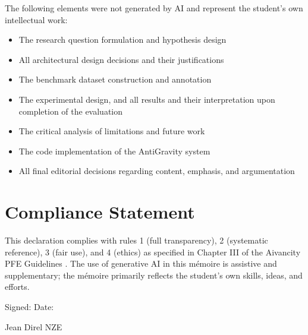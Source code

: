 The following elements were not generated by AI and represent the student's own intellectual work:

\begin{itemize}
  \item The research question formulation and hypothesis design
  \item All architectural design decisions and their justifications
  \item The benchmark dataset construction and annotation
  \item The experimental design, and all results and their interpretation upon completion of the evaluation
  \item The critical analysis of limitations and future work
  \item The code implementation of the AntiGravity system
  \item All final editorial decisions regarding content, emphasis, and argumentation
\end{itemize}

\section*{Compliance Statement}

This declaration complies with rules 1 (full transparency), 2 (systematic reference), 3 (fair use), and 4 (ethics) as specified in Chapter III of the Aivancity PFE Guidelines \citep{AivancityGuide2025}. The use of generative AI in this mémoire is assistive and supplementary; the mémoire primarily reflects the student's own skills, ideas, and efforts.

\bigskip

\noindent Signed: \underline{\hspace{5cm}} \hspace{2cm} Date: \underline{\hspace{3cm}}

\noindent Jean Direl NZE
